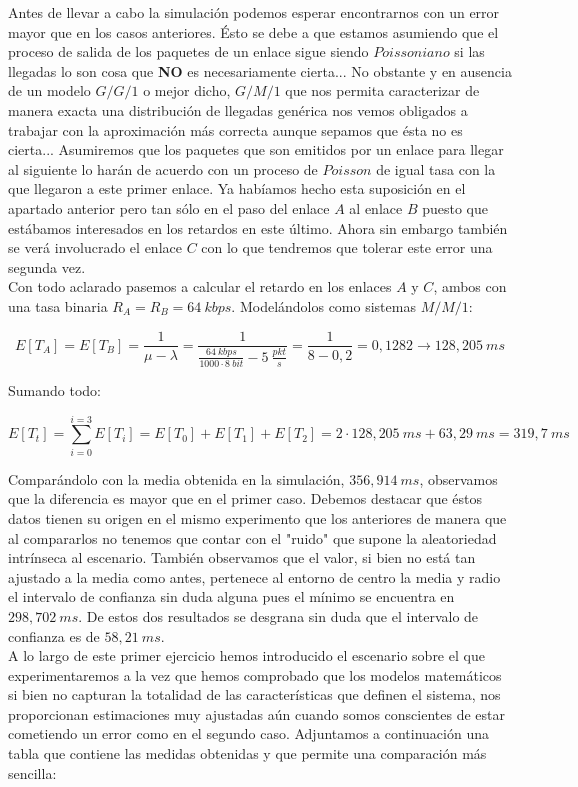 \documentclass{report}[10 pt]
\begin{document}
		Antes de llevar a cabo la simulación podemos esperar encontrarnos con un error mayor que en los casos anteriores. Ésto se debe a que estamos asumiendo que el proceso de salida de los paquetes de un enlace sigue siendo $Poissoniano$ si las llegadas lo son cosa que \textbf{NO} es necesariamente cierta... No obstante y en ausencia de un modelo $G/G/1$ o mejor dicho, $G/M/1$ que nos permita caracterizar de manera exacta una distribución de llegadas genérica nos vemos obligados a trabajar con la aproximación más correcta aunque sepamos que ésta no es cierta... Asumiremos que los paquetes que son emitidos por un enlace para llegar al siguiente lo harán de acuerdo con un proceso de $Poisson$ de igual tasa con la que llegaron a este primer enlace. Ya habíamos hecho esta suposición en el apartado anterior pero tan sólo en el paso del enlace $A$ al enlace $B$ puesto que estábamos interesados en los retardos en este último. Ahora sin embargo también se verá involucrado el enlace $C$ con lo que tendremos que tolerar este error una segunda vez.\\

		Con todo aclarado pasemos a calcular el retardo en los enlaces $A$ y $C$, ambos con una tasa binaria $R_A = R_B = 64\ kbps$. Modelándolos como sistemas $M/M/1$:

		$$E[T_A] = E[T_B] = \frac{1}{\mu - \lambda} = \frac{1}{\frac{64\ kbps}{1000 \cdot 8\ bit} - 5\ \frac{pkt}{s}} = \frac{1}{8 - 0,2} = 0,1282 \rightarrow 128,205\ ms$$

		Sumando todo:

		$$E[T_t] = \sum_{i = 0}^{i = 3}E[T_i] = E[T_0] + E[T_1] + E[T_2] = 2 \cdot 128,205\ ms + 63,29\ ms = 319,7\ ms$$

		Comparándolo con la media obtenida en la simulación, $356,914\ ms$, observamos que la diferencia es mayor que en el primer caso. Debemos destacar que éstos datos tienen su origen en el mismo experimento que los anteriores de manera que al compararlos no tenemos que contar con el "ruido" que supone la aleatoriedad intrínseca al escenario. También observamos que el valor, si bien no está tan ajustado a la media como antes, pertenece al entorno de centro la media y radio el intervalo de confianza sin duda alguna pues el mínimo se encuentra en $298,702\ ms$. De estos dos resultados se desgrana sin duda que el intervalo de confianza es de $58,21\ ms$.\\

		A lo largo de este primer ejercicio hemos introducido el escenario sobre el que experimentaremos a la vez que hemos comprobado que los modelos matemáticos si bien no capturan la totalidad de las características que definen el sistema, nos proporcionan estimaciones muy ajustadas aún cuando somos conscientes de estar cometiendo un error como en el segundo caso. Adjuntamos a continuación una tabla que contiene las medidas obtenidas y que permite una comparación más sencilla:
\end{document}
